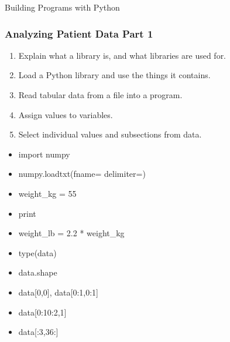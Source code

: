 \documentclass[xcolor=dvipsnames]{beamer}
\begin{document}
\begin{frame}
\begin{center}{\Huge Building Programs with Python}
\end{center}
\end{frame}

\begin{frame} 
\frametitle{Analyzing Patient Data Part 1}
\begin{enumerate}
\item    Explain what a library is, and what libraries are used for.
\item    Load a Python library and use the things it contains.
\item    Read tabular data from a file into a program.
\item    Assign values to variables.
\item    Select individual values and subsections from data.
\end{enumerate}

\begin{multicols}{2}
\begin{itemize}
\item import numpy
\item numpy.loadtxt(fname=  delimiter=)
\item weight\_kg = 55
\item print
\item weight\_lb = 2.2 * weight\_kg
\item type(data)
\item data.shape
\item data[0,0], data[0:1,0:1]
\item data[0:10:2,1]
\item data[:3,36:]
\end{itemize}
\end{multicols}
\end{frame}
\end{document}
